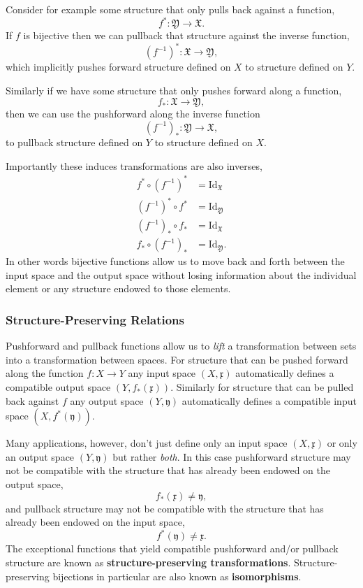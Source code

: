 \documentclass[
  letterpaper,
  DIV=11,
  numbers=noendperiod]{scrartcl}
\begin{document}
Consider for example some structure that only pulls back against a
function, \[
f^{*} : \mathfrak{Y} \rightarrow \mathfrak{X}.
\] If \(f\) is bijective then we can pullback that structure against the
inverse function, \[
(f^{-1})^{*} : \mathfrak{X} \rightarrow \mathfrak{Y},
\] which implicitly pushes forward structure defined on \(X\) to
structure defined on \(Y\).

Similarly if we have some structure that only pushes forward along a
function, \[
f_{*} : \mathfrak{X} \rightarrow \mathfrak{Y},
\] then we can use the pushforward along the inverse function \[
(f^{-1})_{*} : \mathfrak{Y} \rightarrow \mathfrak{X},
\] to pullback structure defined on \(Y\) to structure defined on \(X\).

Importantly these induces transformations are also inverses,
\begin{align*}
f^{*} \circ (f^{-1})^{*} &= \mathrm{Id}_{\mathfrak{X}}
\\
(f^{-1})^{*} \circ f^{*} &= \mathrm{Id}_{\mathfrak{Y}}
\\
(f^{-1})_{*} \circ f_{*} &= \mathrm{Id}_{\mathfrak{X}}
\\
f_{*} \circ (f^{-1})_{*} &= \mathrm{Id}_{\mathfrak{Y}}.
\end{align*} In other words bijective functions allow us to move back
and forth between the input space and the output space without losing
information about the individual element or any structure endowed to
those elements.

\hypertarget{structure-preserving-relations}{%
\subsubsection{Structure-Preserving
Relations}\label{structure-preserving-relations}}

Pushforward and pullback functions allow us to \emph{lift} a
transformation between sets into a transformation between spaces. For
structure that can be pushed forward along the function
\(f : X \rightarrow Y\) any input space \((X, \mathfrak{x})\)
automatically defines a compatible output space
\((Y, f_{*}(\mathfrak{x}))\). Similarly for structure that can be pulled
back against \(f\) any output space \((Y, \mathfrak{y})\) automatically
defines a compatible input space \((X, f^{*}(\mathfrak{y}))\).

Many applications, however, don't just define only an input space
\((X, \mathfrak{x})\) or only an output space \((Y, \mathfrak{y})\) but
rather \emph{both}. In this case pushforward structure may not be
compatible with the structure that has already been endowed on the
output space, \[
f_{*}(\mathfrak{x}) \ne \mathfrak{y},
\] and pullback structure may not be compatible with the structure that
has already been endowed on the input space, \[
f^{*}(\mathfrak{y}) \ne \mathfrak{x}.
\] The exceptional functions that yield compatible pushforward and/or
pullback structure are known as \textbf{structure-preserving
transformations}. Structure-preserving bijections in particular are also
known as \textbf{isomorphisms}.
\end{document}
